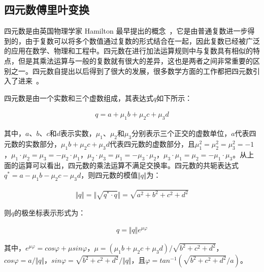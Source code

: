 \subsection{四元数傅里叶变换}
\label{2_2_4}

四元数是由英国物理学家 Hamilton 最早提出的概念~\cite{Hamilton1866book}，它是由普通复数进一步得到的，由于复数可以将多个数值通过复数的形式结合在一起，因此复数已经被广泛的应用在数学、物理和工程中。四元数在进行加法运算规则中与复数具有相似的特点，但是其乘法运算与一般的复数就有很大的差异，这也是两者之间非常重要的区别之一。四元数自提出以后得到了很大的发展，很多数学方面的工作都把四元数引入了进来~\cite{Kantor1989book}。

四元数是由一个实数和三个虚数组成，其表达式$q$如下所示：
\begin{linenomath}
\begin{align}
q=a+\mu_{1}b+\mu_{2}c+\mu_{3}d
\label{式2_28}
\end{align}
\end{linenomath}
其中，$a$、$b$、$c$和$d$表示实数，$\mu_{1}$、$\mu_{2}$和$\mu_{3}$分别表示三个正交的虚数单位，$a$代表四元数的实数部分，$\mu_{1}b+\mu_{2}c+\mu_{3}d$代表四元数的虚数部分，且$\mu_{1}^{2}=\mu_{2}^{2}=\mu_{3}^{2}=-1$，$\mu_{1}\cdot\mu_{2}=\mu_{3}=-\mu_{2}\cdot\mu_{1}$，$\mu_{2}\cdot\mu_{3}=\mu_{1}=-\mu_{3}\cdot\mu_{2}$，$\mu_{3}\cdot\mu_{1}=\mu_{2}=-\mu_{1}\cdot\mu_{3}$。从上面的运算可以看出，四元数的乘法运算不满足交换率。四元数的共轭表达式$q^{*}=a-\mu_{1}b-\mu_{2}c-\mu_{3}d$，则四元数的模值$\Vert q \Vert$为：
\begin{linenomath}
\begin{align}
\Vert q \Vert=\Vert \sqrt{q^{*}\cdot q} \Vert=\sqrt{a^{2}+b^{2}+c^{2}+d^{2}}
\label{式2_29}
\end{align}
\end{linenomath}
则$q$的极坐标表示形式为：
\begin{linenomath}
\begin{align}
q=\Vert q \Vert e^{\mu \varphi}
\label{式2_30}
\end{align}
\end{linenomath}
其中，$e^{\mu \varphi}=cos\varphi+\mu sin\varphi$，$\mu=(\mu_{1}b+\mu_{2}c+\mu_{3}d)/\sqrt{b^{2}+c^{2}+d^{2}}$，$cos\varphi=a/\Vert q \Vert$，$sin\varphi=\sqrt{b^{2}+c^{2}+d^{2}}/\Vert q \Vert$，且$\varphi=tan^{-1}(\sqrt{b^{2}+c^{2}+d^{2}}/a)$。

